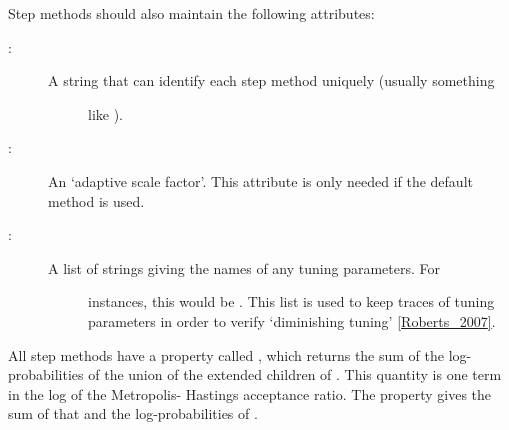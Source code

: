 \documentclass[letterpaper,10pt,english]{sphinxmanual}
\begin{document}
Step methods should also maintain the following attributes:
\begin{description}
\item[{:}] \leavevmode\begin{description}
\item[{A string that can identify each step method uniquely (usually something}] \leavevmode
like ).

\end{description}

\item[{:}] \leavevmode
An `adaptive scale factor'. This attribute is only needed if the default
 method is used.

\item[{:}] \leavevmode\begin{description}
\item[{A list of strings giving the names of any tuning parameters. For}] \leavevmode
{} instances, this would be . This
list is used to keep traces of tuning parameters in order to verify
`diminishing tuning' {\hyperref[references:roberts-2007]{{[}Roberts\_2007{]}}}.

\end{description}

\end{description}

All step methods have a property called , which returns the sum of the log-probabilities of the union of the extended children of . This quantity is one term in the log of the Metropolis- Hastings acceptance ratio. The  property gives the sum of that and the log-probabilities of .
\end{document}
